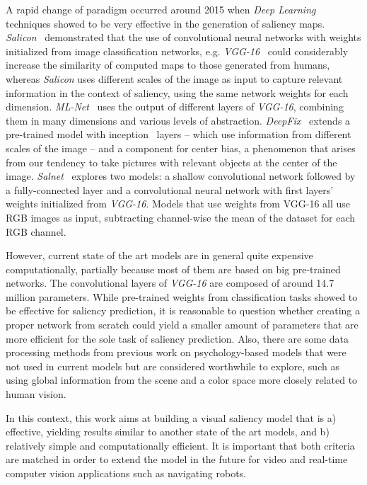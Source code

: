 \documentclass[conference]{IEEEtran}
\begin{document}
A rapid change of paradigm occurred around 2015 when \emph{Deep Learning}
techniques showed to be very effective in the generation of saliency
maps.
\emph{Salicon}~\cite{jiang_2015} demonstrated that the use of
convolutional neural networks with weights initialized from
image classification networks, e.g. \emph{VGG-16}~\cite{zisserman_2014}
could considerably increase the similarity of computed maps to those
generated from humans, whereas \emph{Salicon} uses different scales of the image as input to capture relevant
information in the context of saliency, using the same network weights
for each dimension.
\emph{ML-Net}~\cite{cornia_2016} uses the output of different layers
of \emph{VGG-16}, combining them in many dimensions and various levels of
abstraction.
\emph{DeepFix}~\cite{kruthiventi_2015} extends a pre-trained model with
inception~\cite{szegedy_2014} layers -- which use information from different
scales of the image -- and a component for center bias, a phenomenon that arises from our tendency to take pictures with relevant
objects at the center of the image.
\emph{Salnet}~\cite{pan_2016} explores two models: a shallow convolutional network followed by a fully-connected layer and a convolutional
neural network with first layers' weights initialized from \emph{VGG-16}.
Models that use weights from VGG-16 all use RGB images as input, subtracting
channel-wise the mean of the dataset for each RGB channel.

However, current state of the art models are in general quite expensive computationally,
partially because most of them are based on big pre-trained networks.
The convolutional layers of \emph{VGG-16} are composed of around 14.7
million parameters.
While pre-trained weights from classification tasks showed to be effective
for saliency prediction, it is reasonable to question whether
creating a proper network from scratch could yield a smaller amount of
parameters that are more efficient for the sole task of saliency prediction.
Also, there are some data processing methods from previous work on
psychology-based models that were not used in current models but
are considered worthwhile to explore,
such as using global information from the scene and a color space more
closely related to human vision.

In this context, this work aims at building a visual saliency model that is a) effective,
yielding results similar to another state of the art models,
and b) relatively simple and computationally efficient.
It is important that both criteria are matched in order to extend the
model in the future for video and real-time computer vision applications
such as navigating robots.
\end{document}
